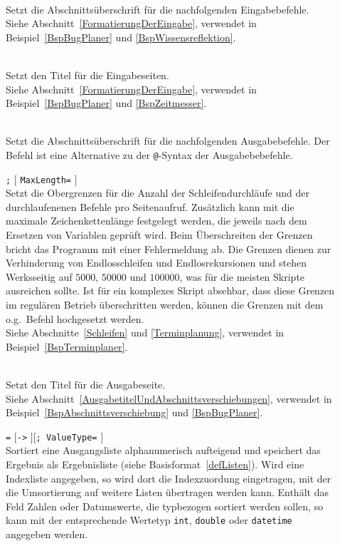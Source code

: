 \begin{description}
\item[] \\
Setzt die Abschnittsüberschrift für die nachfolgenden Eingabebefehle.\\
Siehe Abschnitt~\ref{FormatierungDerEingabe}, verwendet in Beispiel~\ref{BspBugPlaner} und \ref{BspWissensreflektion}.

\item[] \\
Setzt den Titel für die Eingabeseiten.\\
Siehe Abschnitt~\ref{FormatierungDerEingabe}, verwendet in Beispiel~\ref{BspBugPlaner} und \ref{BspZeitmesser}.

\item[] \\
Setzt die Abschnittsüberschrift für die nachfolgenden Ausgabebefehle. Der Befehl ist eine Alternative zu der \verb|@|-Syntax der Ausgabebebefehle.

\item[]  \verb|;|  $[$ \verb|MaxLength=| $]$\\
Setzt die Obergrenzen für die Anzahl der Schleifendurchläufe und der durchlaufenenen Befehle pro Seitenaufruf. Zusätzlich kann mit  die maximale Zeichenkettenlänge festgelegt werden, die jeweils nach dem Ersetzen von Variablen geprüft wird.
Beim Überschreiten der Grenzen bricht das Programm mit einer Fehlermeldung ab.
Die Grenzen dienen zur Verhinderung von Endlosschleifen und Endlosrekursionen und stehen Werksseitig auf $5000$, $50000$ und $100000$, was für die meisten Skripte ausreichen sollte.
Ist für ein komplexes Skript absehbar, dass diese Grenzen im regulären Betrieb überschritten werden, können die Grenzen mit dem o.g.\ Befehl hochgesetzt werden.\\
Siehe Abschnitte~\ref{Schleifen} und \ref{Terminplanung}, verwendet in Beispiel~\ref{BspTerminplaner}.

\item[] \\
Setzt den Titel für die Ausgabeseite.\\
Siehe Abschnitt~\ref{AusgabetitelUndAbschnittsverschiebungen}, verwendet in Beispiel~\ref{BspAbschnittsverschiebung} und \ref{BspBugPlaner}.

\item[]  \verb|=|  $[$\verb|->| $] [$\verb|; ValueType=| $]$\\
Sortiert eine Ausgangsliste alphanumerisch aufteigend und speichert das Ergebnis als Ergebnisliste (siehe Basisformat~\ref{defListen}). Wird eine Indexliste angegeben, so wird dort die Indexzuordung eingetragen, mit der die Umsortierung auf weitere Listen übertragen werden kann. Enthält das Feld Zahlen oder Datumswerte, die typbezogen sortiert werden sollen, so kann mit  der entsprechende Wertetyp \verb|int|, \verb|double| oder \verb|datetime| angegeben werden. 


\end{description}
